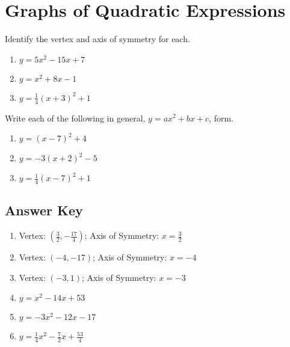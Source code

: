 \chapter{Graphs of Quadratic Expressions}

Identify the vertex and axis of symmetry for each.

\begin{multicols}{3}
\begin{enumerate}   
    \item $y = 5x^2 - 15x + 7$
    \item $y = x^2 + 8x - 1$
    \item $y = \frac{1}{4}\left(x+3\right)^2 + 1$
\end{enumerate} \setcounter{Review}{\value{enumi}}
\end{multicols}

Write each of the following in general, $y = ax^2 + bx + c$, form.

\begin{multicols}{3}
\begin{enumerate}   \setcounter{enumi}{\value{Review}}
    \item $y = (x-7)^2 + 4$
	\item $y = -3(x+2)^2-5$
	\item $y = \frac{1}{4}(x-7)^2+1$
\end{enumerate} \setcounter{Review}{\value{enumi}}
\end{multicols}

\newpage


\section{Answer Key}

\begin{enumerate}
	\item Vertex: $\left(\frac{3}{2}, -\frac{17}{4}\right)$; \quad Axis of Symmetry: $x = \frac{3}{2}$
    \item Vertex: $(-4,-17)$; \quad Axis of Symmetry: $x = -4$
    \item Vertex: $(-3,1)$; \quad Axis of Symmetry: $x = -3$
    
    \item $y = x^2 - 14x + 53$
    \item $y = -3x^2-12x-17$
    \item $y = \frac{1}{4}x^2-\frac{7}{2}x+\frac{53}{4}$
\end{enumerate}
